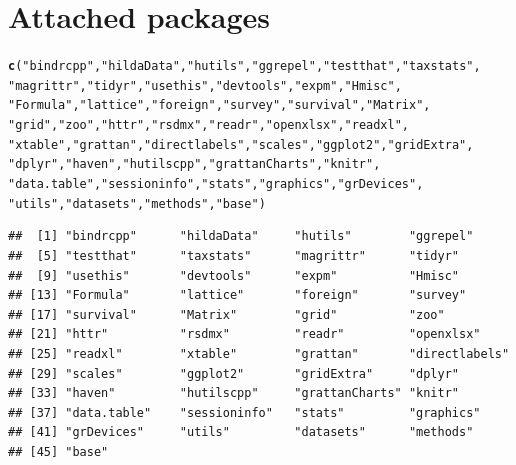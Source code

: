 \documentclass{grattan}\usepackage[]{graphicx}\usepackage[]{color}
\makeatletter
\newcommand{\hlstr}[1]{\textcolor[rgb]{0.192,0.494,0.8}{#1}}%
\newcommand{\hlstd}[1]{\textcolor[rgb]{0.345,0.345,0.345}{#1}}%
\newcommand{\hlkwd}[1]{\textcolor[rgb]{0.737,0.353,0.396}{\textbf{#1}}}%
\newenvironment{kframe}{%
 \def\at@end@of@kframe{}%
 \ifinner\ifhmode%
  \def\at@end@of@kframe{\end{minipage}}%
  \begin{minipage}{\columnwidth}%
 \fi\fi%
 \def\FrameCommand##1{\hskip\@totalleftmargin \hskip-\fboxsep
 \colorbox{shadecolor}{##1}\hskip-\fboxsep
     \hskip-\linewidth \hskip-\@totalleftmargin \hskip\columnwidth}%
 \MakeFramed {\advance\hsize-\width
   \@totalleftmargin\z@ \linewidth\hsize
   \@setminipage}}%
 {\par\unskip\endMakeFramed%
 \at@end@of@kframe}
\newenvironment{knitrout}{}{} %
\makeatother
\begin{document}
\section{Attached packages}
\begin{knitrout}
\color{fgcolor}\begin{kframe}
\begin{alltt}
\hlkwd{c}\hlstd{(}\hlstr{"bindrcpp"}\hlstd{,} \hlstr{"hildaData"}\hlstd{,} \hlstr{"hutils"}\hlstd{,} \hlstr{"ggrepel"}\hlstd{,} \hlstr{"testthat"}\hlstd{,} \hlstr{"taxstats"}\hlstd{,}
\hlstr{"magrittr"}\hlstd{,} \hlstr{"tidyr"}\hlstd{,} \hlstr{"usethis"}\hlstd{,} \hlstr{"devtools"}\hlstd{,} \hlstr{"expm"}\hlstd{,} \hlstr{"Hmisc"}\hlstd{,}
\hlstr{"Formula"}\hlstd{,} \hlstr{"lattice"}\hlstd{,} \hlstr{"foreign"}\hlstd{,} \hlstr{"survey"}\hlstd{,} \hlstr{"survival"}\hlstd{,} \hlstr{"Matrix"}\hlstd{,}
\hlstr{"grid"}\hlstd{,} \hlstr{"zoo"}\hlstd{,} \hlstr{"httr"}\hlstd{,} \hlstr{"rsdmx"}\hlstd{,} \hlstr{"readr"}\hlstd{,} \hlstr{"openxlsx"}\hlstd{,} \hlstr{"readxl"}\hlstd{,}
\hlstr{"xtable"}\hlstd{,} \hlstr{"grattan"}\hlstd{,} \hlstr{"directlabels"}\hlstd{,} \hlstr{"scales"}\hlstd{,} \hlstr{"ggplot2"}\hlstd{,} \hlstr{"gridExtra"}\hlstd{,}
\hlstr{"dplyr"}\hlstd{,} \hlstr{"haven"}\hlstd{,} \hlstr{"hutilscpp"}\hlstd{,} \hlstr{"grattanCharts"}\hlstd{,} \hlstr{"knitr"}\hlstd{,}
\hlstr{"data.table"}\hlstd{,} \hlstr{"sessioninfo"}\hlstd{,} \hlstr{"stats"}\hlstd{,} \hlstr{"graphics"}\hlstd{,} \hlstr{"grDevices"}\hlstd{,}
\hlstr{"utils"}\hlstd{,} \hlstr{"datasets"}\hlstd{,} \hlstr{"methods"}\hlstd{,} \hlstr{"base"}\hlstd{)}
\end{alltt}
\begin{verbatim}
##  [1] "bindrcpp"      "hildaData"     "hutils"        "ggrepel"      
##  [5] "testthat"      "taxstats"      "magrittr"      "tidyr"        
##  [9] "usethis"       "devtools"      "expm"          "Hmisc"        
## [13] "Formula"       "lattice"       "foreign"       "survey"       
## [17] "survival"      "Matrix"        "grid"          "zoo"          
## [21] "httr"          "rsdmx"         "readr"         "openxlsx"     
## [25] "readxl"        "xtable"        "grattan"       "directlabels" 
## [29] "scales"        "ggplot2"       "gridExtra"     "dplyr"        
## [33] "haven"         "hutilscpp"     "grattanCharts" "knitr"        
## [37] "data.table"    "sessioninfo"   "stats"         "graphics"     
## [41] "grDevices"     "utils"         "datasets"      "methods"      
## [45] "base"
\end{verbatim}
\end{kframe}
\end{knitrout}
\end{document}
